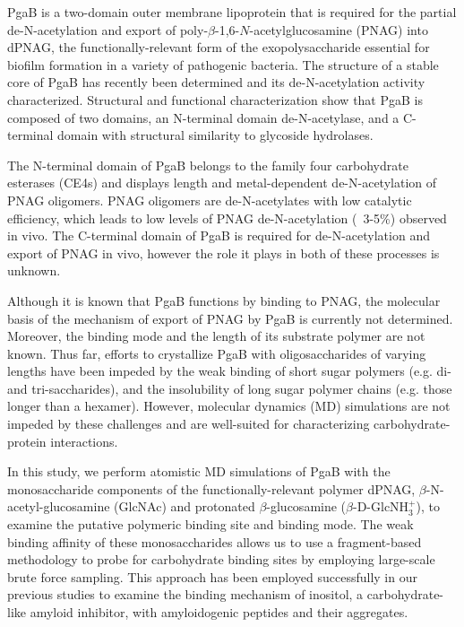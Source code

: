 PgaB is a two-domain outer membrane lipoprotein that is required for the partial de-N-acetylation and export of poly-$\beta$-1,6-$N$-acetylglucosamine (PNAG) into dPNAG, the functionally-relevant form of the exopolysaccharide essential for biofilm formation in a variety of pathogenic bacteria.\cite{Little:2012dp} The structure of a stable core of PgaB has recently been determined and its de-N-acetylation activity characterized.\cite{Little:2012dp,Little:2012go} Structural and functional characterization show that PgaB is composed of two domains, an N-terminal domain de-N-acetylase, and a C-terminal domain with structural similarity to glycoside hydrolases.\cite{Little:2012dp}

The N-terminal domain of PgaB belongs to the family four carbohydrate esterases (CE4s)\cite{Cantarel:2009ff} and displays length and metal-dependent de-N-acetylation of PNAG oligomers.\cite{Little:2012dp} PNAG oligomers are de-N-acetylates with low catalytic efficiency,\cite{Little:2012dp,Nishiyama:2013bb} which leads to low levels of PNAG de-N-acetylation (~3-5\%) observed in vivo.\cite{Itoh:2008dv,Wang:2004wv} The C-terminal domain of PgaB is required for de-N-acetylation and export of PNAG in vivo, however the role it plays in both of these processes is unknown.\cite{Itoh:2008dv}
 
Although it is known that PgaB functions by binding to PNAG, the molecular basis of the mechanism of export of PNAG by PgaB is currently not determined. Moreover, the binding mode and the length of its substrate polymer are not known.  Thus far, efforts to crystallize PgaB with oligosaccharides of varying lengths have been impeded by the weak binding of short sugar polymers (e.g. di- and tri-saccharides), and the insolubility of long sugar polymer chains (e.g. those longer than a hexamer). However, molecular dynamics (MD) simulations are not impeded by these challenges and are well-suited for characterizing carbohydrate-protein interactions.\cite{Fadda:2010p5889}

In this study, we perform atomistic MD simulations of PgaB with the monosaccharide components of the functionally-relevant polymer dPNAG, $\beta$-N-acetyl-glucosamine (GlcNAc) and protonated $\beta$-glucosamine ($\beta$-D-GlcNH$_{3}^{+}$), to examine the putative polymeric binding site and binding mode. The weak binding affinity of these monosaccharides allows us to use a fragment-based methodology to probe for carbohydrate binding sites by employing large-scale brute force sampling. This approach has been employed successfully in our previous studies to examine the binding mechanism of inositol, a carbohydrate-like amyloid inhibitor, with amyloidogenic peptides and their aggregates.\cite{Li:2012bx, Li:2013fo}

